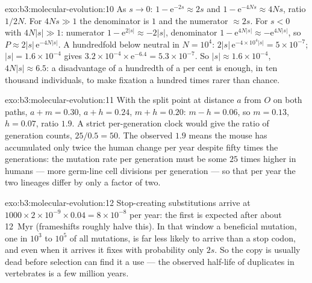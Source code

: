 \begin{solution}{exo:b3:molecular-evolution:10}
As $s \to 0$: $1 - \mathrm{e}^{-2s} \approx 2s$ and $1 - \mathrm{e}^{-4Ns}
\approx 4Ns$, ratio $1/2N$. For $4Ns \gg 1$ the denominator is $1$ and the
numerator $\approx 2s$. For $s < 0$ with $4N|s| \gg 1$: numerator $1 -
\mathrm{e}^{2|s|} \approx -2|s|$, denominator $1 - \mathrm{e}^{4N|s|} \approx
-\mathrm{e}^{4N|s|}$, so $P \approx 2|s|\,\mathrm{e}^{-4N|s|}$. A hundredfold
below neutral in $N = 10^{4}$: $2|s|\,\mathrm{e}^{-4\times 10^{4}|s|} =
5\times 10^{-7}$; $|s| = 1.6\times 10^{-4}$ gives $3.2\times 10^{-4}\times
\mathrm{e}^{-6.4} = 5.3\times 10^{-7}$. So $|s| \approx 1.6\times 10^{-4}$,
$4N|s| \approx 6.5$: a disadvantage of a hundredth of a per cent is
enough, in ten thousand individuals, to make fixation a hundred times
rarer than chance.
\end{solution}

\begin{solution}{exo:b3:molecular-evolution:11}
With the split point at distance $a$ from $O$ on both paths, $a + m =
0.30$, $a + h = 0.24$, $m + h = 0.20$: $m - h = 0.06$, so $m = 0.13$, $h
= 0.07$, ratio $1.9$. A strict per-generation clock would give the
ratio of generation counts, $25/0.5 = 50$. The observed $1.9$ means the
mouse has accumulated only twice the human change per year despite
fifty times the generations: the mutation rate per generation must be
some $25$ times higher in humans --- more germ-line cell divisions per
generation --- so that per year the two lineages differ by only a factor
of two.
\end{solution}

\begin{solution}{exo:b3:molecular-evolution:12}
Stop-creating substitutions arrive at $1000\times 2\times 10^{-9}\times
0.04 = 8\times 10^{-8}$ per year: the first is expected after about
\qty{12}{Myr} (frameshifts roughly halve this). In that window a
beneficial mutation, one in $10^{3}$ to $10^{5}$ of all mutations, is far
less likely to arrive than a stop codon, and even when it arrives it
fixes with probability only $2s$. So the copy is usually dead before
selection can find it a use --- the observed half-life of duplicates in
vertebrates is a few million years.
\end{solution}

